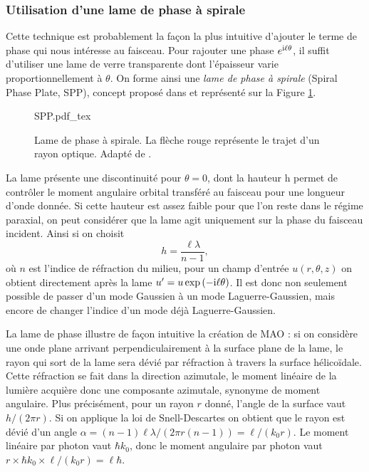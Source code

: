\subsubsection{Utilisation d'une lame de phase à spirale}
Cette technique est probablement la façon la plus intuitive d'ajouter le terme de phase qui nous intéresse au faisceau. Pour rajouter une phase $e^{\mathrm{i}\ell\theta}$, il suffit d'utiliser une lame de verre transparente dont l'épaisseur varie proportionnellement à $\theta$. On forme ainsi une \textit{lame de phase à spirale} (Spiral Phase Plate, SPP), concept proposé dans  et représenté sur la Figure \ref{Fig:SPP}.\par
\begin{figure}[!ht]
\centering
\def\svgwidth{0.5\columnwidth}
{SPP.pdf_tex}
\caption{Lame de phase à spirale. La flèche rouge représente le trajet d'un rayon optique. Adapté de .}
\label{Fig:SPP}
\end{figure}
La lame présente une discontinuité pour $\theta=0$\degres, dont la hauteur h permet de contrôler le moment angulaire orbital transféré au faisceau pour une longueur d'onde donnée. Si cette hauteur est assez faible pour que l'on reste dans le régime paraxial, on peut considérer que la lame agit uniquement sur la phase du faisceau incident. Ainsi si on choisit 
\begin{equation*}
h = \frac{\ell\lambda}{n-1},
\end{equation*}
où $n$ est l'indice de réfraction du milieu, pour un champ d'entrée $u(r,\theta,z)$ on obtient directement après la lame $u' = u\exp{(-\mathrm{i}\ell \theta)}$.	Il est donc non seulement possible de passer d'un mode Gaussien à un mode Laguerre-Gaussien, mais encore de changer l'indice d'un mode déjà Laguerre-Gaussien.\par
La lame de phase illustre de façon intuitive la création de MAO : si on considère une onde plane arrivant perpendiculairement à la surface plane de la lame, le rayon qui sort de la lame sera dévié par réfraction à travers la surface hélicoïdale. Cette réfraction se fait dans la direction azimutale, le moment linéaire de la lumière acquière donc une composante azimutale, synonyme de moment angulaire. Plus précisément, pour un rayon $r$ donné, l'angle de la surface	vaut $h/(2\pi r)$. Si on applique la loi de Snell-Descartes on obtient que le rayon est dévié d'un angle $\alpha = (n-1)\ell\lambda/(2\pi r(n-1)) = \ell/(k_0r)$. Le moment linéaire par photon vaut $\hbar k_0$, donc le moment angulaire par photon vaut $r\times\hbar k_0\times\ell/(k_0r) = \ell\hbar$.


